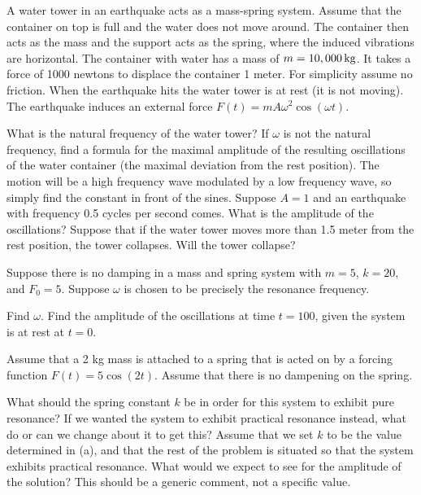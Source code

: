 \documentclass{ximera}
\begin{document}
\begin{exercise}
    A water tower in an earthquake acts as a mass-spring system. Assume that the container on top is full and the water does not move around. The container then acts as the mass and the support acts as the spring, where the induced vibrations are horizontal.  The container with water has a mass of $m=\unit[10,000]{kg}$.  It takes a force of 1000 newtons to displace the container 1 meter.  For simplicity assume no friction. When the earthquake hits the water tower is at rest (it is not moving). 
    The earthquake induces an external force $F(t) = m A \omega^2 \cos (\omega t)$.
    \begin{tasks}
        \task What is the natural frequency of the water tower?
        \task If $\omega$ is not the natural frequency, find a formula for the maximal amplitude of the resulting oscillations of the water container (the maximal deviation from the rest position).  The motion will be a high frequency wave modulated by a low frequency wave, so simply find the constant in front of the sines.
        \task Suppose $A = 1$ and an earthquake with frequency 0.5 cycles per second comes.  What is the amplitude of the oscillations?  Suppose that if the water tower moves more than 1.5 meter from the rest position, the tower collapses. Will the tower collapse? 
    \end{tasks}
\end{exercise}

\begin{exercise}%
    Suppose there is no damping in a mass and spring system with $m = 5$, $k= 20$, and $F_0 = 5$.  Suppose $\omega$ is chosen to be precisely the resonance frequency.
    \begin{tasks}
        \task Find $\omega$.
        \task Find the amplitude of the oscillations at time $t=100$, given the system is at rest at $t=0$.
    \end{tasks}
\end{exercise}

\begin{exercise}
    Assume that a 2 kg mass is attached to a spring that is acted on by a forcing function $F(t) = 5 \cos(2t)$. Assume that there is no dampening on the spring.
    \begin{tasks}
        \task What should the spring constant $k$ be in order for this system to exhibit pure resonance?
        \task If we wanted the system to exhibit practical resonance instead, what do or can we change about it to get this?
        \task Assume that we set $k$ to be the value determined in (a), and that the rest of the problem is situated so that the system exhibits practical resonance. What would we expect to see for the amplitude of the solution? This should be a generic comment, not a specific value.
    \end{tasks}
\end{exercise}
\end{document}
